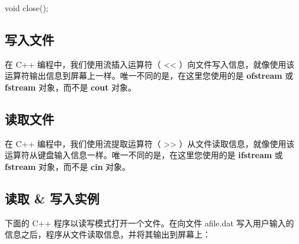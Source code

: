\documentclass[
]{article}
\newenvironment{Shaded}{}{}
\newcommand{\DataTypeTok}[1]{\textcolor[rgb]{0.56,0.13,0.00}{#1}}
\newcommand{\NormalTok}[1]{#1}
\newcommand{\OperatorTok}[1]{\textcolor[rgb]{0.40,0.40,0.40}{#1}}
\begin{document}
\begin{Shaded}
\begin{Highlighting}[]
\DataTypeTok{void}\NormalTok{ close}\OperatorTok{();}
\end{Highlighting}
\end{Shaded}

\hypertarget{ux5199ux5165ux6587ux4ef6}{%
\subsection{写入文件}\label{ux5199ux5165ux6587ux4ef6}}

在 C++ 编程中，我们使用流插入运算符（ \textless\textless{}
）向文件写入信息，就像使用该运算符输出信息到屏幕上一样。唯一不同的是，在这里您使用的是
\textbf{ofstream} 或 \textbf{fstream} 对象，而不是 \textbf{cout} 对象。

\hypertarget{ux8bfbux53d6ux6587ux4ef6}{%
\subsection{读取文件}\label{ux8bfbux53d6ux6587ux4ef6}}

在 C++ 编程中，我们使用流提取运算符（ \textgreater\textgreater{}
）从文件读取信息，就像使用该运算符从键盘输入信息一样。唯一不同的是，在这里您使用的是
\textbf{ifstream} 或 \textbf{fstream} 对象，而不是 \textbf{cin} 对象。

\hypertarget{ux8bfbux53d6-ux5199ux5165ux5b9eux4f8b}{%
\subsection{读取 \&
写入实例}\label{ux8bfbux53d6-ux5199ux5165ux5b9eux4f8b}}

下面的 C++ 程序以读写模式打开一个文件。在向文件 afile.dat
写入用户输入的信息之后，程序从文件读取信息，并将其输出到屏幕上：
\end{document}
